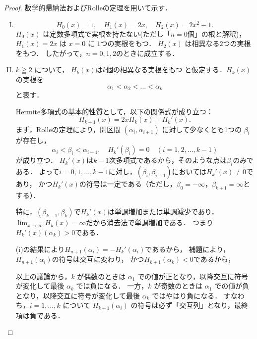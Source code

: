 \documentclass[a4paper,10pt,fleqn]{ltjsarticle}
\begin{document}
\begin{leftbar}
    \begin{proof}
        数学的帰納法およびRolleの定理を用いて示す．
        \noindent
        \begin{enumerate}[(I)]
            \item \mbox{}
                  \[
                      H_0(x) = 1, \quad H_1(x) = 2x, \quad H_2(x) = 2x^2-1.
                  \]
                  $H_0(x)$ は定数多項式で実根を持たない(ただし「$n=0$個」の根と解釈)，
                  $H_1(x) = 2x$ は $x=0$ に $1$つの実根をもつ．
                  $H_2(x)$ は相異なる$2$つの実根をもつ．
                  したがって，$n=0,1,2$のときに成立する．
            \item
                  $k \geqq 2$ について，
                  $H_k(x)$は$k$個の相異なる実根をもつ
                  と仮定する．$H_k(x)$ の実根を
                  \[
                      \alpha_1 < \alpha_2 < \dots < \alpha_k
                  \]
                  と表す．

                  Hermite多項式の基本的性質として，以下の関係式が成り立つ：
                  \[
                      H_{k+1}(x)  = 2xH_k(x)-H_k'(x).
                  \]
                  まず，Rolleの定理により，開区間 $(\alpha_i,\alpha_{i+1})$ に対して少なくとも1つの $\beta_i$ が存在し，
                  \[
                      \alpha_i < \beta_i < \alpha_{i+1},\quad
                      H_k'(\beta_i) = 0
                      \quad (i=1,2,\dots,k-1)
                  \]
                  が成り立つ．
                  $H_k '(x)$は$k-1$次多項式であるから，そのような点は$\beta_i$のみである．
                  よって$i = 0,1,\dots,k-1$に対し，$(\beta_i,\beta_{i+1})$においては$H_k '(x) \ne 0$であり，
                  かつ$H_k '(x)$の符号は一定である（ただし，$ \beta_0 =-\infty$，$\beta_{k+1} = \infty$とする）．

                  特に，$(\beta_{k-1},\beta_k)$で$H_k '(x)$は単調増加または単調減少であり，
                  $\lim_{x \to \infty} H_k (x) =\infty$だから消去法で単調増加である．
                  つまり$H_k '(x) (\alpha_k) > 0$である．

                  (i)の結果により$H_{n+1} (\alpha_i) =-H_k'(\alpha_i)$であるから，
                  補題により，$H_{n+1}(\alpha_i)$の符号は交互に変わり，
                  かつ$H_{k+1}(\alpha_k) < 0$であるから，

                  以上の議論から，$k$ が偶数のときは $\alpha_1$ での値が正となり，以降交互に符号が変化して最後 $\alpha_k$ では負になる．
                  一方，$k$ が奇数のときは $\alpha_1$ での値が負となり，以降交互に符号が変化して最後 $\alpha_k$ ではやはり負になる．
                  すなわち，$i=1,\dots,k$ について $H_{k+1}(\alpha_i)$ の符号は必ず「交互列」となり，最終項は負である．


\end{enumerate}
\end{proof}
\end{leftbar}
\end{document}
